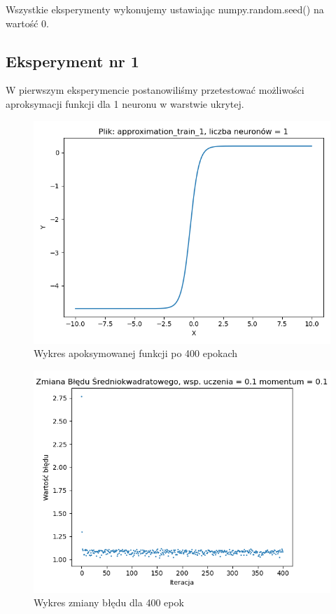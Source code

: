 \documentclass[12pt]{article}
\begin{document}
Wszystkie eksperymenty wykonujemy ustawiając numpy.random.seed() na wartość 0.


\subsection{Eksperyment nr 1}

W pierwszym eksperymencie postanowiliśmy przetestować możliwości\\ 
aproksymacji funkcji dla 1 neuronu w warstwie ukrytej.
\begin{figure}[!htb]
 \centering
 \includegraphics[width=12cm]{FunctionPlot1Neuron.png}
 \caption{Wykres apoksymowanej funkcji po 400 epokach}
 \vspace{-0.3cm}
 \label{WykresFun1}
\end{figure}



\begin{figure}[!htb]
 \centering
 \includegraphics[width=12cm]{ZmianaBledu1Neuron.png}
 \vspace{-0.3cm}
 \caption{Wykres zmiany błędu dla 400 epok}
 \label{WykresBlad1}
\end{figure}
\end{document}
